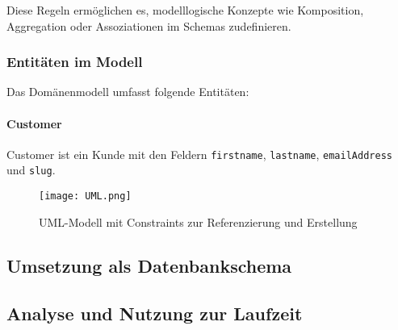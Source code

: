 Diese Regeln ermöglichen es, modelllogische Konzepte wie Komposition, Aggregation oder Assoziationen im Schemas zudefinieren.  

\subsubsection*{Entitäten im Modell}
Das Domänenmodell umfasst folgende Entitäten:

\paragraph{Customer}
Customer ist ein Kunde mit den Feldern \texttt{firstname}, \texttt{lastname}, \texttt{emailAddress} und \texttt{slug}.



\begin{figure}[H]
  \centering
  \texttt{[image: UML.png]}
  \caption{UML-Modell mit Constraints zur Referenzierung und Erstellung}
  \label{fig:uml_modell}
\end{figure}


\subsection{Umsetzung als Datenbankschema}
\label{sec:schema-umsetzung}


\subsection{Analyse und Nutzung zur Laufzeit}
